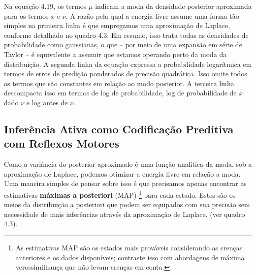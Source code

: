 \documentclass[
  12pt,
]{book}
\begin{document}
Na equação 4.19, os termos \(\mu\) indicam a moda da densidade posterior
aproximada para os termos \(x\) e \(\nu\). A razão pela qual a energia livre
assume uma forma tão simples na primeira linha é que empregamos uma
aproximação de Laplace, conforme detalhado no quadro 4.3. Em resumo,
isso trata todas as densidades de probabilidade como gaussianas, o que
-- por meio de uma expansão em série de Taylor -- é equivalente a
assumir que estamos operando perto da moda da distribuição. A segunda
linha da equação expressa a probabilidade logarítmica em termos de erros
de predição ponderados de precisão quadrática. Isso omite todos os
termos que são constantes em relação ao modo posterior. A terceira linha
descompacta isso em termos de log de probabilidade, log de probabilidade
de \(x\) dado \(\nu\) e log antes de \(\nu\).

\hypertarget{inferuxeancia-ativa-como-codificauxe7uxe3o-preditiva-com-reflexos-motores}{%
\subsection{Inferência Ativa como Codificação Preditiva com Reflexos Motores}\label{inferuxeancia-ativa-como-codificauxe7uxe3o-preditiva-com-reflexos-motores}}

Como a variância do posterior aproximado é uma função analítica da moda,
sob a aproximação de Laplace, podemos otimizar a energia livre em
relação a moda. Uma maneira simples de pensar sobre isso é que
precisamos apenas encontrar as estimativas \textbf{máximas a posteriori}
(MAP) \footnote{As estimativas MAP são os estados mais prováveis considerando as
  crenças anteriores e os dados disponíveis; contraste isso com
  abordagens de máxima verossimilhança que não levam crenças em conta.} para cada estado. Estes são os meios da distribuição a
posteriori que podem ser equipados com sua precisão sem necessidade de
mais inferências através da aproximação de Laplace. (ver quadro 4.3).
\end{document}
